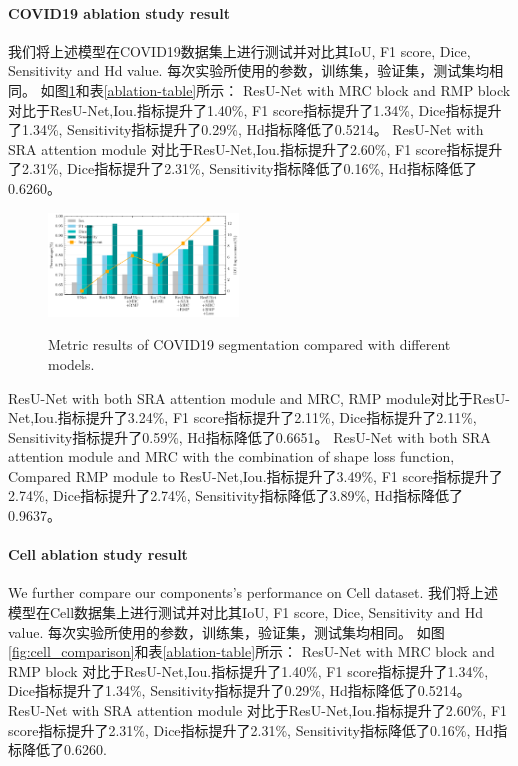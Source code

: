 \documentclass{ieeeaccess}
\begin{document}
    \paragraph{COVID19 ablation study result}
    我们将上述模型在COVID19数据集上进行测试并对比其IoU, F1 score, Dice, Sensitivity and Hd value. 每次实验所使用的参数，训练集，验证集，测试集均相同。
    如图\ref{fig:covid_comparison}和表\ref{ablation-table}所示：
    ResU-Net with MRC block and RMP block 对比于ResU-Net,Iou.指标提升了1.40\%, F1 score指标提升了1.34\%, Dice指标提升了1.34\%, Sensitivity指标提升了0.29\%, Hd指标降低了0.5214。
    ResU-Net with SRA attention module 对比于ResU-Net,Iou.指标提升了2.60\%, F1 score指标提升了2.31\%, Dice指标提升了2.31\%, Sensitivity指标降低了0.16\%, Hd指标降低了0.6260。
    \begin{figure}[htbp]
      \begin{center}
      \includegraphics[width=0.45\textwidth]{figure/covid_comparison.pdf}
      \vspace{-2mm}
      \caption{Metric results of COVID19 segmentation compared with different models.} 
      \vspace{-2mm}
      \label{fig:covid_comparison}
      \end{center}
      \vspace{-0.35cm}
    \end{figure}
    ResU-Net with both SRA attention module and MRC, RMP module对比于ResU-Net,Iou.指标提升了3.24\%, F1 score指标提升了2.11\%, Dice指标提升了2.11\%, Sensitivity指标提升了0.59\%, Hd指标降低了0.6651。
    ResU-Net with both SRA attention module and MRC with the combination of shape loss function, 
    Compared RMP module to ResU-Net,Iou.指标提升了3.49\%, F1 score指标提升了2.74\%, Dice指标提升了2.74\%, Sensitivity指标降低了3.89\%, Hd指标降低了0.9637。
    
    \paragraph{Cell ablation study result}
    We further compare our components's performance on Cell dataset.
    我们将上述模型在Cell数据集上进行测试并对比其IoU, F1 score, Dice, Sensitivity and Hd value. 每次实验所使用的参数，训练集，验证集，测试集均相同。
    如图\ref{fig:cell_comparison}和表\ref{ablation-table}所示：
    ResU-Net with MRC block and RMP block 对比于ResU-Net,Iou.指标提升了1.40\%, F1 score指标提升了1.34\%, Dice指标提升了1.34\%, Sensitivity指标提升了0.29\%, Hd指标降低了0.5214。
    ResU-Net with SRA attention module 对比于ResU-Net,Iou.指标提升了2.60\%, F1 score指标提升了2.31\%, Dice指标提升了2.31\%, Sensitivity指标降低了0.16\%, Hd指标降低了0.6260.
    
\end{document}
